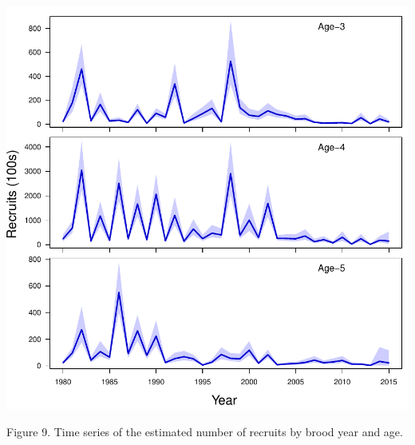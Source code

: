 \documentclass[11pt,]{article}
\begin{document}
\includegraphics{App_3_Summarize_results_files/figure-latex/plot_recruits_by_age-1.pdf}

Figure 9. Time series of the estimated number of recruits by brood year
and age.
\end{document}
